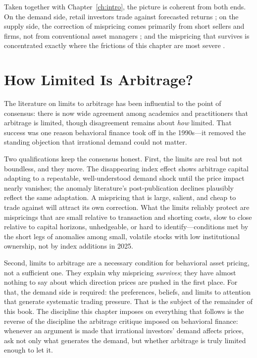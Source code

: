 Taken together with Chapter~\ref{ch:intro}, the picture is coherent from both ends. On the demand side, retail investors trade against forecasted returns \citep{mclean2025}; on the supply side, the correction of mispricing comes primarily from short sellers and firms, not from conventional asset managers \citep{mclean2025,edelen2016}; and the mispricing that survives is concentrated exactly where the frictions of this chapter are most severe \citep{nagel2005,stambaugh2015,chu2020,bowles2024}.

\section{How Limited Is Arbitrage?}
\label{sec:arbsummary}

The literature on limits to arbitrage has been influential to the point of consensus: there is now wide agreement among academics and practitioners that arbitrage is limited, though disagreement remains about \emph{how} limited. That success was one reason behavioral finance took off in the 1990s---it removed the standing objection that irrational demand could not matter.

Two qualifications keep the consensus honest. First, the limits are real but not boundless, and they move. The disappearing index effect \citep{greenwood2025} shows arbitrage capital adapting to a repeatable, well-understood demand shock until the price impact nearly vanishes; the anomaly literature's post-publication declines \citep{mclean2016} plausibly reflect the same adaptation. A mispricing that is large, salient, and cheap to trade against will attract its own correction. What the limits reliably protect are mispricings that are small relative to transaction and shorting costs, slow to close relative to capital horizons, unhedgeable, or hard to identify---conditions met by the short legs of anomalies among small, volatile stocks with low institutional ownership, not by index additions in 2025.

Second, limits to arbitrage are a necessary condition for behavioral asset pricing, not a sufficient one. They explain why mispricing \emph{survives}; they have almost nothing to say about which direction prices are pushed in the first place. For that, the demand side is required: the preferences, beliefs, and limits to attention that generate systematic trading pressure. That is the subject of the remainder of this book. The discipline this chapter imposes on everything that follows is the reverse of the discipline the arbitrage critique imposed on behavioral finance: whenever an argument is made that irrational investors' demand affects prices, ask not only what generates the demand, but whether arbitrage is truly limited enough to let it.

